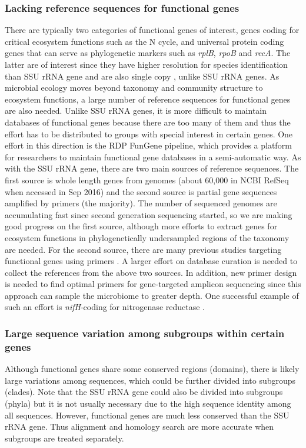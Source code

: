 \documentclass[]{msu-thesis}
\begin{document}
\subsubsection{Lacking reference sequences for functional genes}
There are typically two categories of functional genes of interest,
genes coding for critical ecosystem functions such as the N cycle, and
universal protein coding genes that can serve as phylogenetic markers
such as \textit{rplB}, \textit{rpoB} and \textit{recA}. The latter are
of interest since they have higher resolution for species identification
than SSU rRNA gene and are also single copy
\cite{case_use_2007,roux_comparison_2011}, unlike SSU rRNA genes.  As
microbial ecology moves beyond taxonomy and community structure to
ecosystem functions, a large number of reference sequences for
functional genes are also needed. Unlike SSU rRNA genes, it is more
difficult to maintain databases of functional genes because there are
too many of them and thus the effort has to be distributed to groups
with special interest in certain genes. One effort in this direction is
the RDP FunGene pipeline, which provides a platform for researchers to
maintain functional gene databases in a semi-automatic way. As with the
SSU rRNA gene, there are two main sources of reference sequences. The
first source is whole length genes from genomes (about 60,000 in NCBI
RefSeq when accessed in Sep 2016) and the second source is partial gene
sequences amplified by primers (the majority). The number of sequenced
genomes are accumulating fast since second generation sequencing
started, so we are making good progress on the first source, although
more efforts to extract genes for ecosystem functions in
phylogenetically undersampled regions of the taxonomy are needed. For
the second source, there are many previous studies targeting functional
genes using primers
\cite{penton_functional_2013,hai_quantification_2009,treusch_novel_2005,huang_biodiversity_2011}.
A larger effort on database curation is needed to collect the references
from the above two sources. In addition, new primer design is needed to
find optimal primers for gene-targeted amplicon sequencing since this
approach can sample the microbiome to greater depth. One successful
example of such an effort is \textit{nifH}-coding for nitrogenase
reductase \cite{gaby_comprehensive_2014,gaby_comprehensive_2012}.

\subsubsection{Large sequence variation among subgroups within certain genes}
Although functional genes share some conserved regions (domains), there
is likely large variations among sequences, which could be further
divided into subgroups (clades). Note that the SSU rRNA gene could also be
divided into subgroups (phyla) but it is not usually necessary due to
the high sequence identity among all sequences. However, functional
genes are much less conserved than the SSU rRNA gene. Thus alignment and
homology search are more accurate when subgroups are treated separately.
\end{document}
